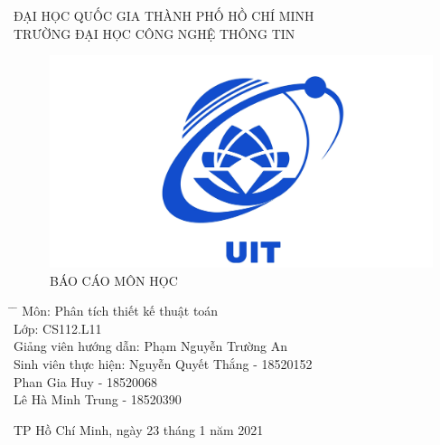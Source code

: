\documentclass[10pt,a4paper]{article}
\begin{document}
\fontsize{20}{30}\selectfont
{\centering ĐẠI HỌC QUỐC GIA THÀNH PHỐ HỒ CHÍ MINH\\TRƯỜNG ĐẠI HỌC CÔNG NGHỆ THÔNG TIN\par}
\vspace{2 cm}
\begin{center}
    \begin{figure}[htp]
    \begin{center}
     \includegraphics[scale=.3]{logo_uit.jpg} \\
     \fontsize{34}{30}\selectfont
    BÁO CÁO MÔN HỌC \par
    \end{center}
    \end{figure}
    \vspace{1 cm}
    \fontsize{14}{30}\selectfont
    \begin{tabbing}
    \hspace{2 in} \= \hspace{2 in} \= \kill
    Môn: \> Phân tích thiết kế thuật toán \\
    Lớp: \> CS112.L11 \\
    Giảng viên hướng dẫn: \> Phạm Nguyễn Trường An \\
    Sinh viên thực hiện: \> Nguyễn Quyết Thắng - 18520152 \\
    \hspace{5.3 cm}Phan Gia Huy - 18520068 \\
    \hspace{5.3 cm}Lê Hà Minh Trung - 18520390 \\
    \end{tabbing}  

    \begin{center}
    \fontsize{14}{30}\selectfont
     TP Hồ Chí Minh, ngày 23 tháng 1 năm 2021
    \end{center}
\end{center}
\end{document}
